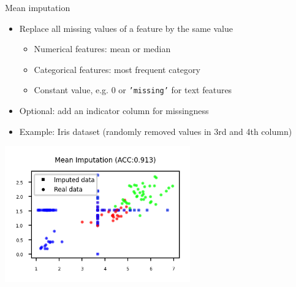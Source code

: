 \begin{frame}[allowframebreaks]{Mean imputation}

\begin{itemize}
    \item Replace all missing values of a feature by the same value
    \begin{itemize}
        \item Numerical features: mean or median
        \item Categorical features: most frequent category
        \item Constant value, e.g. 0 or \texttt{'missing'} for text features
    \end{itemize}

    \item Optional: add an indicator column for missingness

    \item Example: Iris dataset (randomly removed values in 3rd and 4th column)
\end{itemize}

\vspace{1em}

\begin{center}
    \includegraphics[width=0.6\textwidth]{images/pre-processing/mean-imputation.png}
\end{center}

\end{frame}


